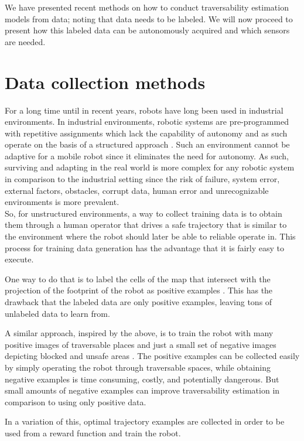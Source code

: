 \documentclass[12pt,a4paper,table,dvipsnames,tikz]{report}
\begin{document}
	
	We have presented recent methods on how to conduct traversability estimation 
	models from data; noting that data needs to be labeled. We will now proceed to 
	present how this labeled data can be autonomously acquired and which sensors are 
	needed.
	\\
	
	\section{Data collection methods}
	\label{sec:bg:data}
	
	For a long time until in recent years, robots have long been used in industrial 
	environments. In industrial environments, robotic systems are pre-programmed 
	with repetitive assignments which lack the capability of autonomy and as such 
	operate on the basis of a structured approach \citep{Shabbir}. Such an environment
	cannot be adaptive for a mobile robot since it eliminates the need for autonomy. 
	As such, surviving and adapting in the real world is more complex for any robotic
	system in comparison to the industrial setting since the risk of failure, system 
	error, external factors, obstacles, corrupt data, human error and unrecognizable 
	environments is more prevalent.
	\\
	
	So, for unstructured environments, a way to collect training data is to obtain 
	them through a human operator that drives a safe trajectory that is similar to 
	the environment where the robot should later be able to reliable operate in. 
	This process for training data generation has the advantage that it is fairly 
	easy to execute.
	\par 
	One way to do that is to label the cells of the map that intersect with the 
	projection of the footprint of the robot as positive examples \citep{Suger}. 
	This has the drawback that the labeled data are only positive examples, leaving 
	tons of unlabeled data to learn from.
	\par
	A similar approach, inspired by the above, is to train the robot with many 
	positive images of traversable places and just a small set of negative images 
	depicting blocked and unsafe areas \citep{HiroseGonet}. The positive examples can 
	be collected easily by simply operating the robot through traversable spaces, 
	while obtaining negative examples is time consuming, costly, and potentially 
	dangerous. But small amounts of negative examples can improve traversability 
	estimation in comparison to using only positive data.
	\par 
	In a variation of this, optimal trajectory examples are collected \citep{Wigness} 
	in order to be used from a reward function and train the robot.
	\\
	
\end{document}

